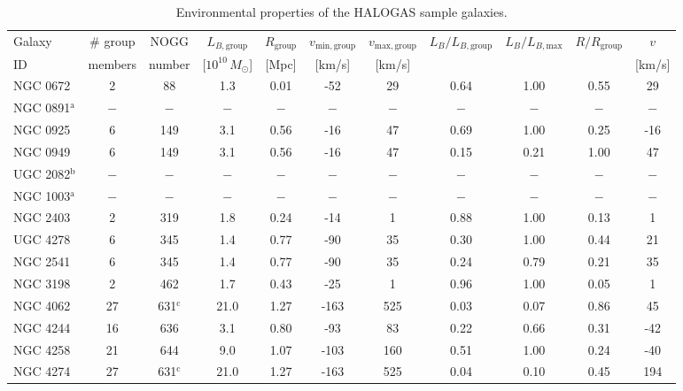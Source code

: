 \documentclass[oldversion]{aa}
\begin{document}
\begin{table}
\caption{Environmental properties of the HALOGAS sample galaxies.}
\label{table:environment}
\centering
\begin{tabular}{lcccccccccc}
\hline\hline
Galaxy & \# group & NOGG & $L_{B,\mathrm{group}}$ & $R_{\mathrm{group}}$ & $v_{\mathrm{min,group}}$ & $v_{\mathrm{max,group}}$ & $L_B/L_{B,\mathrm{group}}$ & $L_B/L_{B,\mathrm{max}}$ & $R/R_{\mathrm{group}}$ & $v$ \\
ID & members & number & [$10^{10}\,M_{\odot}$] & [Mpc] & [km/s] & [km/s] & $\,$ & $\,$ & $\,$ & [km/s] \\
\hline
NGC 0672              & 2   & 88               & 1.3  & 0.01 & -52  & 29  & 0.64 & 1.00 & 0.55 & 29 \\
NGC 0891$^\mathrm{a}$ & $-$ & $-$              & $-$  & $-$  & $-$  & $-$ & $-$  & $-$  & $-$  & $-$ \\   
NGC 0925              & 6   & 149              & 3.1  & 0.56 & -16  & 47  & 0.69 & 1.00 & 0.25 & -16 \\
NGC 0949              & 6   & 149              & 3.1  & 0.56 & -16  & 47  & 0.15 & 0.21 & 1.00 & 47 \\
UGC 2082$^\mathrm{b}$ & $-$ & $-$              & $-$  & $-$  & $-$  & $-$ & $-$  & $-$  & $-$  & $-$ \\   
NGC 1003$^\mathrm{a}$ & $-$ & $-$              & $-$  & $-$  & $-$  & $-$ & $-$  & $-$  & $-$  & $-$ \\
NGC 2403              & 2   & 319              & 1.8  & 0.24 & -14  & 1   & 0.88 & 1.00 & 0.13 & 1 \\
UGC 4278              & 6   & 345              & 1.4  & 0.77 & -90  & 35  & 0.30 & 1.00 & 0.44 & 21 \\
NGC 2541              & 6   & 345              & 1.4  & 0.77 & -90  & 35  & 0.24 & 0.79 & 0.21 & 35 \\
NGC 3198              & 2   & 462              & 1.7  & 0.43 & -25  & 1   & 0.96 & 1.00 & 0.05 & 1 \\
NGC 4062              & 27  & 631$^\mathrm{c}$ & 21.0 & 1.27 & -163 & 525 & 0.03 & 0.07 & 0.86 & 45 \\
NGC 4244              & 16  & 636              & 3.1  & 0.80 & -93  & 83  & 0.22 & 0.66 & 0.31 & -42 \\
NGC 4258              & 21  & 644              & 9.0  & 1.07 & -103 & 160 & 0.51 & 1.00 & 0.24 & -40 \\
NGC 4274              & 27  & 631$^\mathrm{c}$ & 21.0 & 1.27 & -163 & 525 & 0.04 & 0.10 & 0.45 & 194 \\

\end{tabular}
\end{table}
\end{document}
